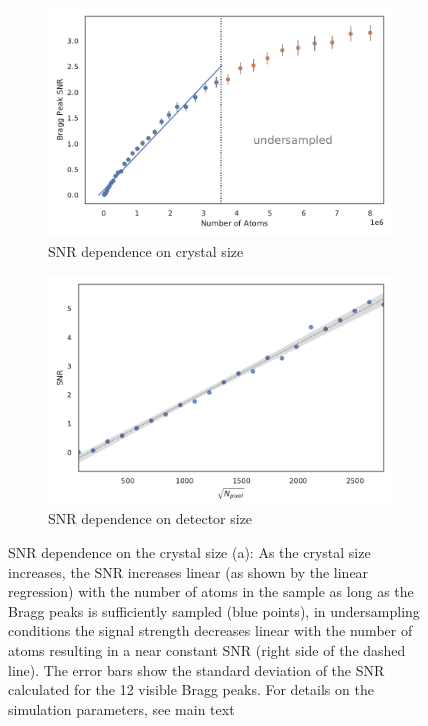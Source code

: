 \begin{figure}
	\centering
	\begin{subfigure}[b]{0.45\textwidth}
		\includegraphics[width=\linewidth]{images/SNRNatoms.pdf}
		\caption{ SNR dependence on crystal size}
		\label{fig:SNRNatoms}
	\end{subfigure}
	\hspace{0.02\textwidth}
	\begin{subfigure}[b]{0.45\textwidth}
		\includegraphics[width=\linewidth]{images/detsize.pdf}
		\caption{SNR dependence on detector size}
		\label{fig:SNRdetsize}
	\end{subfigure}
\caption[SNR dependence on crystal size and detector size]{SNR dependence on the crystal size (a): As the crystal size increases, the SNR increases linear (as shown by the linear regression) with the number of atoms in the sample as long as the Bragg peaks is sufficiently sampled (blue points), in undersampling conditions the signal strength decreases linear with the number of atoms resulting in a near constant SNR (right side of the dashed line). The error bars show the standard deviation of the SNR calculated for the 12 visible Bragg peaks. For details on the simulation parameters, see main text}

\end{figure}


